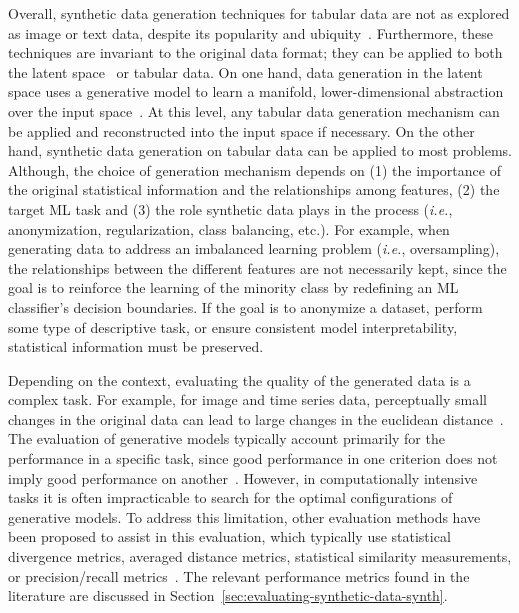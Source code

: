 Overall, synthetic data generation techniques for tabular data are not as
explored as image or text data, despite its popularity and
ubiquity~\cite{fakoor2020fast}. Furthermore, these techniques are invariant to
the original data format; they can be applied to both the latent
space~\cite{DeVries2017} or tabular data. On one hand, data generation
in the latent space uses a generative model to learn a manifold,
lower-dimensional abstraction over the input
space~\cite{kingma2019introduction}. At
this level, any tabular data generation mechanism can be applied and
reconstructed into the input space if necessary. On the other hand, synthetic
data generation on tabular data can be applied to most problems. Although, the
choice of generation mechanism depends on (1) the importance of the original
statistical information and the relationships among features, (2) the target
ML task and (3) the role synthetic data plays in the process (\textit{i.e.},
anonymization, regularization, class balancing, etc.).  For example, when
generating data to address an imbalanced learning problem (\textit{i.e.},
oversampling), the relationships between the different features are not
necessarily kept, since the goal is to reinforce the learning of the minority
class by redefining an ML classifier's decision boundaries. If the goal is to
anonymize a dataset, perform some type of descriptive task, or ensure
consistent model interpretability, statistical information must be preserved.

Depending on the context, evaluating the quality of the generated data is a
complex task. For example, for image and time series data, perceptually small
changes in the original data can lead to large changes in the euclidean
distance~\cite{assefa2020generating, theis2016note}. The evaluation of
generative models typically account primarily for the performance in a
specific task, since good performance in one criterion does not imply good
performance on another~\cite{theis2016note}. However, in computationally
intensive tasks it is often impracticable to search for the optimal
configurations of generative models. To address this limitation, other
evaluation methods have been proposed to assist in this evaluation, which
typically use statistical divergence metrics, averaged distance metrics,
statistical similarity measurements, or precision/recall
metrics~\cite{chundawat2022tabsyndex, alaa2022faithful}. The relevant
performance metrics found in the literature are discussed in
Section~\ref{sec:evaluating-synthetic-data-synth}.

